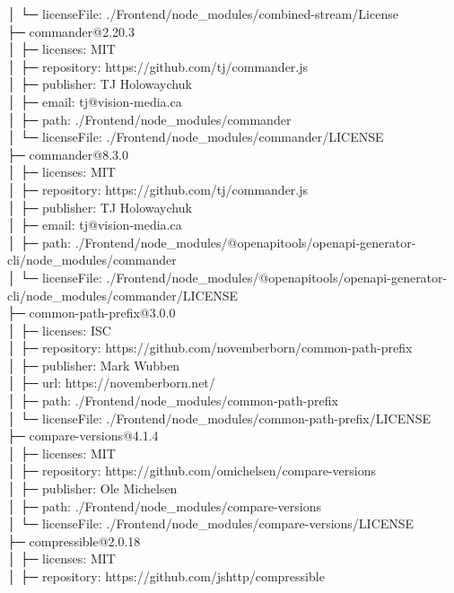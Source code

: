 │  └─ licenseFile: ./Frontend/node\_modules/combined-stream/License\\
├─ commander@2.20.3\\
│  ├─ licenses: MIT\\
│  ├─ repository: https://github.com/tj/commander.js\\
│  ├─ publisher: TJ Holowaychuk\\
│  ├─ email: tj@vision-media.ca\\
│  ├─ path: ./Frontend/node\_modules/commander\\
│  └─ licenseFile: ./Frontend/node\_modules/commander/LICENSE\\
├─ commander@8.3.0\\
│  ├─ licenses: MIT\\
│  ├─ repository: https://github.com/tj/commander.js\\
│  ├─ publisher: TJ Holowaychuk\\
│  ├─ email: tj@vision-media.ca\\
│  ├─ path: ./Frontend/node\_modules/@openapitools/openapi-generator-cli/node\_modules/commander\\
│  └─ licenseFile: ./Frontend/node\_modules/@openapitools/openapi-generator-cli/node\_modules/commander/LICENSE\\
├─ common-path-prefix@3.0.0\\
│  ├─ licenses: ISC\\
│  ├─ repository: https://github.com/novemberborn/common-path-prefix\\
│  ├─ publisher: Mark Wubben\\
│  ├─ url: https://novemberborn.net/\\
│  ├─ path: ./Frontend/node\_modules/common-path-prefix\\
│  └─ licenseFile: ./Frontend/node\_modules/common-path-prefix/LICENSE\\
├─ compare-versions@4.1.4\\
│  ├─ licenses: MIT\\
│  ├─ repository: https://github.com/omichelsen/compare-versions\\
│  ├─ publisher: Ole Michelsen\\
│  ├─ path: ./Frontend/node\_modules/compare-versions\\
│  └─ licenseFile: ./Frontend/node\_modules/compare-versions/LICENSE\\
├─ compressible@2.0.18\\
│  ├─ licenses: MIT\\
│  ├─ repository: https://github.com/jshttp/compressible\\
